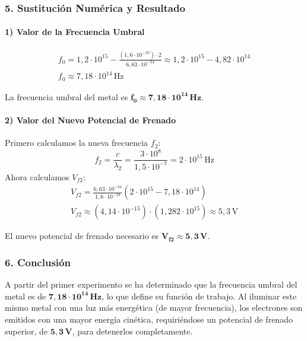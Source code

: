 \subsubsection*{5. Sustitución Numérica y Resultado}
\paragraph*{1) Valor de la Frecuencia Umbral}
\begin{gather}
    f_0 = 1,2 \cdot 10^{15} - \frac{(1,6 \cdot 10^{-19}) \cdot 2}{6,63 \cdot 10^{-34}} \approx 1,2 \cdot 10^{15} - 4,82 \cdot 10^{14} \\
    f_0 \approx 7,18 \cdot 10^{14} \, \text{Hz}
\end{gather}
\begin{cajaresultado}
    La frecuencia umbral del metal es $\boldsymbol{f_0 \approx 7,18 \cdot 10^{14} \, \textbf{Hz}}$.
\end{cajaresultado}

\paragraph*{2) Valor del Nuevo Potencial de Frenado}
Primero calculamos la nueva frecuencia $f_2$:
$$f_2 = \frac{c}{\lambda_2} = \frac{3 \cdot 10^8}{1,5 \cdot 10^{-7}} = 2 \cdot 10^{15} \, \text{Hz}$$
Ahora calculamos $V_{f2}$:
\begin{gather}
    V_{f2} = \frac{6,63 \cdot 10^{-34}}{1,6 \cdot 10^{-19}} \left( 2 \cdot 10^{15} - 7,18 \cdot 10^{14} \right) \\
    V_{f2} \approx (4,14 \cdot 10^{-15}) \cdot (1,282 \cdot 10^{15}) \approx 5,3 \, \text{V}
\end{gather}
\begin{cajaresultado}
    El nuevo potencial de frenado necesario es $\boldsymbol{V_{f2} \approx 5,3 \, \textbf{V}}$.
\end{cajaresultado}

\subsubsection*{6. Conclusión}
\begin{cajaconclusion}
A partir del primer experimento se ha determinado que la frecuencia umbral del metal es de $\mathbf{7,18 \cdot 10^{14} \, Hz}$, lo que define su función de trabajo. Al iluminar este mismo metal con una luz más energética (de mayor frecuencia), los electrones son emitidos con una mayor energía cinética, requiriéndose un potencial de frenado superior, de $\mathbf{5,3 \, V}$, para detenerlos completamente.
\end{cajaconclusion}

